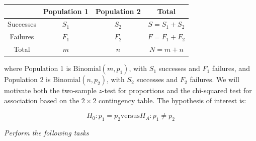 \documentclass[letterpaper]{article}
\begin{document}
		\begin{center}
			\begin{tabular}{c|c|c|c}
				& Population 1 & Population 2 & Total \\
				\hline
				Successes & $S_1$ & $S_2$ & $S = S_1 + S_2$ \\
				Failures & $F_1$ & $F_2$ & $F = F_1 + F_2$ \\
				\hline
				Total & $m$ & $n$ & $N = m + n$
			\end{tabular}
		\end{center}
		
		where Population 1 is $\text{Binomial}(m,p_1)$, with $S_1$ successes and $F_1$ failures, and Population 2 is $\text{Binomial}(n,p_2)$, with $S_2$ successes and $F_2$ failures. 
		We will motivate both the two-sample $z$-test for proportions and the chi-squared test for association based on the $2\times2$ contingency table. 
		The hypothesis of interest is:
		
		\[
		H_0: p_1 = p_2
		\text{versus} 
		H_A: p_1 \neq p_2
		\]
		
		\emph{Perform the following tasks}
		
\end{document}
